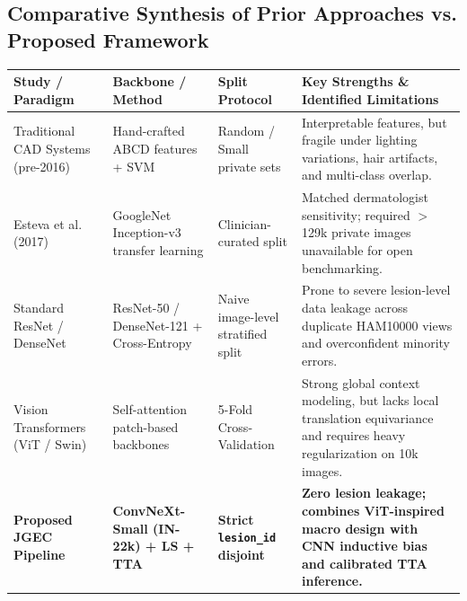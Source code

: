 \documentclass[12pt,a4paper]{article}
\begin{document}
\subsection{Comparative Synthesis of Prior Approaches vs. Proposed Framework}
\begin{table}[h!]
\centering
\renewcommand{\arraystretch}{1.25}
\begin{tabularx}{\textwidth}{l l l X}
\toprule
\textbf{Study / Paradigm} & \textbf{Backbone / Method} & \textbf{Split Protocol} & \textbf{Key Strengths \& Identified Limitations} \\
\midrule
Traditional CAD Systems (pre-2016) & Hand-crafted ABCD features + SVM & Random / Small private sets & Interpretable features, but fragile under lighting variations, hair artifacts, and multi-class overlap. \\
Esteva et al. (2017) & GoogleNet Inception-v3 transfer learning & Clinician-curated split & Matched dermatologist sensitivity; required $>$129k private images unavailable for open benchmarking. \\
Standard ResNet / DenseNet & ResNet-50 / DenseNet-121 + Cross-Entropy & Naive image-level stratified split & Prone to severe lesion-level data leakage across duplicate HAM10000 views and overconfident minority errors. \\
Vision Transformers (ViT / Swin) & Self-attention patch-based backbones & 5-Fold Cross-Validation & Strong global context modeling, but lacks local translation equivariance and requires heavy regularization on 10k images. \\
\textbf{Proposed JGEC Pipeline} & \textbf{ConvNeXt-Small (IN-22k) + LS + TTA} & \textbf{Strict \texttt{lesion\_id} disjoint} & \textbf{Zero lesion leakage; combines ViT-inspired macro design with CNN inductive bias and calibrated TTA inference.} \\
\bottomrule
\end{tabularx}
\end{table}
\end{document}
